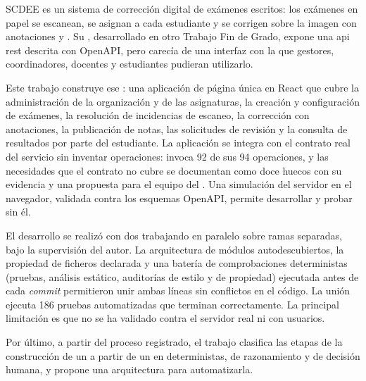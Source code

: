 SCDEE es un sistema de corrección digital de exámenes escritos: los exámenes en papel se
escanean, se asignan a cada estudiante y se corrigen sobre la imagen con anotaciones y
. Su , desarrollado en otro Trabajo Fin de Grado, expone una
\acs{api} \acs{rest} descrita con OpenAPI, pero carecía de una interfaz con la que gestores,
coordinadores, docentes y estudiantes pudieran utilizarlo.

Este trabajo construye ese : una aplicación de página única en React que
cubre la administración de la organización y de las asignaturas, la creación y
configuración de exámenes, la resolución de incidencias de escaneo, la corrección con
anotaciones, la publicación de notas, las solicitudes de revisión y la consulta de
resultados por parte del estudiante. La aplicación se integra con el contrato real del
servicio sin inventar operaciones: invoca 92 de sus 94 operaciones, y las necesidades que
el contrato no cubre se documentan como doce huecos con su evidencia y una propuesta para
el equipo del . Una simulación del servidor en el navegador, validada contra
los esquemas OpenAPI, permite desarrollar y probar sin él.

El desarrollo se realizó con dos  trabajando en paralelo sobre ramas
separadas, bajo la supervisión del autor. La arquitectura de módulos autodescubiertos, la
propiedad de ficheros declarada y una batería de comprobaciones deterministas (pruebas,
análisis estático, auditorías de estilo y de propiedad) ejecutada antes de cada
\textit{commit} permitieron unir ambas líneas sin conflictos en el código. La unión
ejecuta 186 pruebas automatizadas que terminan correctamente. La principal limitación es
que no se ha validado contra el servidor real ni con usuarios.

Por último, a partir del proceso registrado, el trabajo clasifica las etapas de la
construcción de un  a partir de un  en deterministas, de
razonamiento y de decisión humana, y propone una arquitectura para automatizarla.
